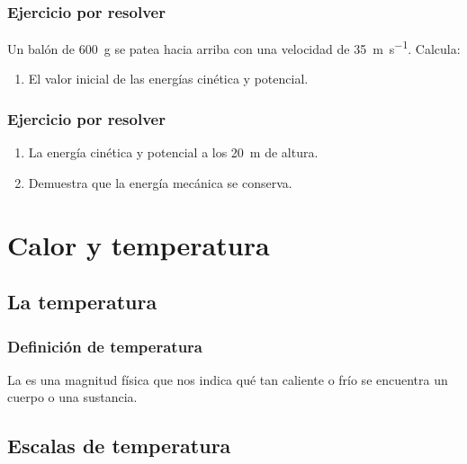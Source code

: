 \documentclass[14pt]{beamer}
\begin{document}
\begin{frame}
\frametitle{Ejercicio por resolver}
Un balón de \SI{600}{\gram} se patea hacia arriba con una velocidad de \SI{35}{\meter\per\second}. \pause Calcula:
\pause
{}
\begin{enumerate}[<+->]
\item El valor inicial de las energías cinética y potencial.
\seti
\end{enumerate}
\end{frame}
\begin{frame}
\frametitle{Ejercicio por resolver}
\begin{enumerate}[<+->]    
\conti
\item La energía cinética y potencial a los \SI{20}{\meter} de altura.
\item Demuestra que la energía mecánica se conserva.
\end{enumerate}
\end{frame}

\section{Calor y temperatura}
\subsection{La temperatura}

\begin{frame}
\frametitle{Definición de temperatura}
La  es una magnitud física que nos indica qué tan caliente o frío se encuentra un cuerpo o una sustancia.
\end{frame}

\subsection{Escalas de temperatura}
\end{document}
